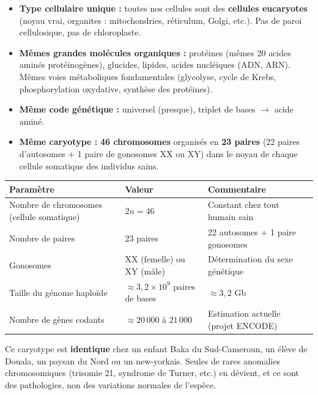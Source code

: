 \documentclass[11pt]{article}
\begin{document}
\begin{aretenir}
\begin{itemize}
    \item \textbf{Type cellulaire unique :} toutes nos cellules sont des \textbf{cellules eucaryotes} (noyau vrai, organites : mitochondries, réticulum, Golgi, etc.). Pas de paroi cellulosique, pas de chloroplaste.
    \item \textbf{Mêmes grandes molécules organiques :} protéines (mêmes 20 acides aminés protéinogènes), glucides, lipides, acides nucléiques (ADN, ARN). Mêmes voies métaboliques fondamentales (glycolyse, cycle de Krebs, phosphorylation oxydative, synthèse des protéines).
    \item \textbf{Même code génétique :} universel (presque), triplet de bases $\rightarrow$ acide aminé.
    \item \textbf{Même caryotype :} \textbf{46 chromosomes} organisés en \textbf{23 paires} (22 paires d'autosomes + 1 paire de gonosomes XX ou XY) dans le noyau de chaque cellule somatique des individus sains.
\end{itemize}
\end{aretenir}

\begin{exemplebox}
\begin{center}
\begin{tabularx}{\linewidth}{|l|X|X|}\hline
\rowcolor{popblueL}
\textbf{Paramètre} & \textbf{Valeur} & \textbf{Commentaire} \\ \hline
Nombre de chromosomes (cellule somatique) & $2n = 46$ & Constant chez tout humain sain \\ \hline
Nombre de paires & 23 paires & 22 autosomes + 1 paire gonosomes \\ \hline
Gonosomes & XX (femelle) ou XY (mâle) & Détermination du sexe génétique \\ \hline
Taille du génome haploïde & $\approx 3,2 \times 10^9$ paires de bases & $\approx 3,2$ Gb \\ \hline
Nombre de gènes codants & $\approx 20\,000$ à $21\,000$ & Estimation actuelle (projet ENCODE) \\ \hline
\end{tabularx}
\end{center}
Ce caryotype est \textbf{identique} chez un enfant Baka du Sud-Cameroun, un élève de Douala, un paysan du Nord ou un new-yorkais. Seules de rares anomalies chromosomiques (trisomie 21, syndrome de Turner, etc.) en dévient, et ce sont des pathologies, non des variations normales de l'espèce.
\end{exemplebox}
\end{document}
